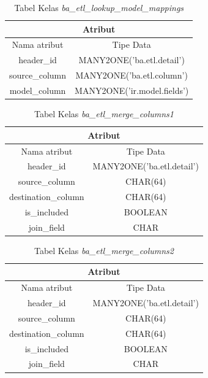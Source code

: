 \begin{table}[H]
	\centering
		\caption{Tabel Kelas \textit{ba\_etl\_lookup\_model\_mappings}}
		\begin{tabular}{ | c | c|}
			\hline
				\multicolumn{2}{|c|}{Atribut}\\ \hline 
				Nama atribut & Tipe Data\\ \hline
				header\_id & MANY2ONE('ba.etl.detail')\\ \hline
				source\_column & MANY2ONE('ba.etl.column')\\ \hline
				model\_column & MANY2ONE('ir.model.fields')\\ \hline
		\end{tabular}
\end{table}

\begin{table}[H]
	\centering
		\caption{Tabel Kelas \textit{ba\_etl\_merge\_columns1}}
		\begin{tabular}{ | c | c|}
			\hline
				\multicolumn{2}{|c|}{Atribut}\\ \hline 
				Nama atribut & Tipe Data\\ \hline
				header\_id & MANY2ONE('ba.etl.detail')\\ \hline
				source\_column & CHAR(64)\\ \hline
				destination\_column & CHAR(64)\\ \hline
				is\_included & BOOLEAN\\ \hline
				join\_field & CHAR\\ \hline
		\end{tabular}
\end{table}

\begin{table}[H]
	\centering
		\caption{Tabel Kelas \textit{ba\_etl\_merge\_columns2}}
		\begin{tabular}{ | c | c|}
			\hline
				\multicolumn{2}{|c|}{Atribut}\\ \hline 
				Nama atribut & Tipe Data\\ \hline
				header\_id & MANY2ONE('ba.etl.detail')\\ \hline
				source\_column & CHAR(64)\\ \hline
				destination\_column & CHAR(64)\\ \hline
				is\_included & BOOLEAN\\ \hline
				join\_field & CHAR\\ \hline
		\end{tabular}
\end{table}

